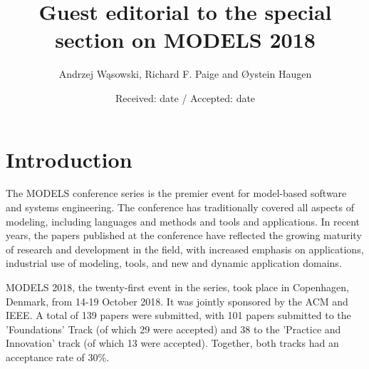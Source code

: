 \documentclass{svjour3}                     %
\begin{document}
\title{Guest editorial to the special section on MODELS 2018}


\author{Andrzej W\k{a}sowski, Richard F. Paige and \O ystein Haugen}



\date{Received: date / Accepted: date}


\maketitle

\section{Introduction}

The MODELS conference series is the premier event for model-based software and systems engineering. The conference
has traditionally covered all aspects of modeling, including languages and methods and tools and applications. In recent years,
the papers published at the conference have reflected the growing maturity of research and development in the field, with increased
emphasis on applications, industrial use of modeling, tools, and new and dynamic application domains. 

MODELS 2018, the twenty-first event in the series, took place in Copenhagen, Denmark, from 14-19 October 2018. It was jointly sponsored
by the ACM and IEEE. A total of 139 papers were submitted, with 101 papers submitted to the 'Foundations' Track (of which 29 were
accepted) and 38 to the 'Practice and Innovation' track (of which 13 were accepted). Together, both tracks had an acceptance rate of
30\%.
\end{document}
